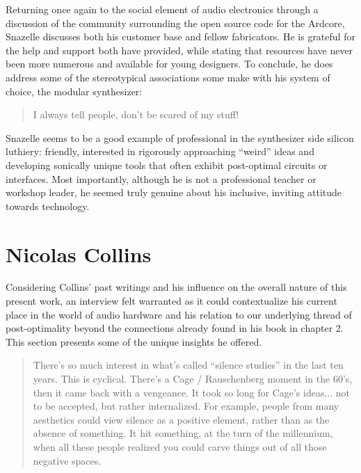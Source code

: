 Returning once again to the social element of audio electronics through a discussion of the community surrounding the open source code for the Ardcore, Snazelle discusses both his customer base and fellow fabricators. He is grateful for the help and support both have provided, while stating that resources have never been more numerous and available for young designers. To conclude, he does address some of the stereotypical associations some make with his system of choice, the modular synthesizer: 

\begin{quote}
	 I always tell people, don’t be scared of my stuff!
\end{quote}

Snazelle seems to be a good example of professional in the synthesizer side silicon luthiery: friendly, interested in rigorously approaching ``weird'' ideas and developing sonically unique tools that often exhibit post-optimal circuits or interfaces. Most importantly, although he is not a professional teacher or workshop leader, he seemed truly genuine about his inclusive, inviting attitude towards technology. 

\section{Nicolas Collins}

Considering Collins' past writings and his influence on the overall nature of this present work, an interview  felt warranted as it could contextualize his current place in the world of audio hardware and his relation to our underlying thread of post-optimality beyond the connections already found in his book in chapter 2. This section presents some of the unique insights he offered. 

\begin{quote}

There’s so much interest in what’s called ``silence studies'' in the last ten years. This is cyclical. There’s a Cage / Rauschenberg moment in the 60’s, then it came back with a vengeance. It took so long for Cage’s ideas... not to be accepted, but rather internalized. For example, people from many aesthetics could view silence as a positive element, rather than as the absence of something. It hit something, at the turn of the millennium, when all these people realized you could carve things out of all those negative spaces.

\end{quote}

